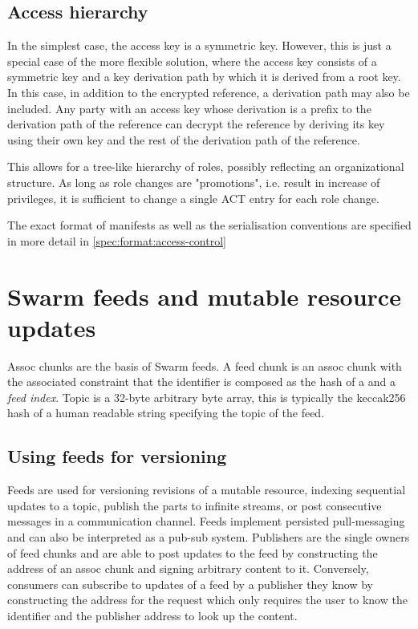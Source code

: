 \subsection{Access hierarchy}

In the simplest case, the access key is a symmetric key. However, this is just a special case of the more flexible solution, where
the access key consists of a symmetric key and a key derivation path by which it is derived from a root key. In this case, in addition to the encrypted reference, a derivation path may also be included. Any party with an access key whose derivation is a prefix to the derivation path of the reference can decrypt the reference by deriving its key using their own key and the rest of the derivation path of the reference.

This allows for a tree-like hierarchy of roles, possibly reflecting an organizational structure. As long as role changes are "promotions", i.e. result in increase of privileges, it is sufficient to change a single ACT entry for each role change.

The exact format of manifests as well as the serialisation conventions are specified in more detail in \ref{spec:format:access-control}



\section{Swarm feeds and mutable resource updates}\label{sec:feeds}


Assoc chunks are the basis of Swarm feeds. A feed chunk is an assoc chunk with the associated constraint that the identifier is composed as the hash of a  and a \emph{feed index}. Topic is a 32-byte arbitrary byte array, this is typically the keccak256 hash of a human readable string specifying the topic of the feed.
    
\subsection{Using feeds for versioning}\label{sec:feed-as-channel}

Feeds are used for versioning revisions of a mutable resource, indexing sequential updates to a topic, publish the parts to infinite streams, or post consecutive messages in a communication channel. Feeds implement persisted pull-messaging and can also be interpreted as a pub-sub system. Publishers are the single owners of feed chunks and are able to post updates to the feed by constructing the address of an assoc chunk and signing arbitrary content to it. Conversely, consumers can subscribe to updates of a feed by a publisher they know by constructing the address for the request which only requires the user to know the identifier and the publisher address to look up the content. 

